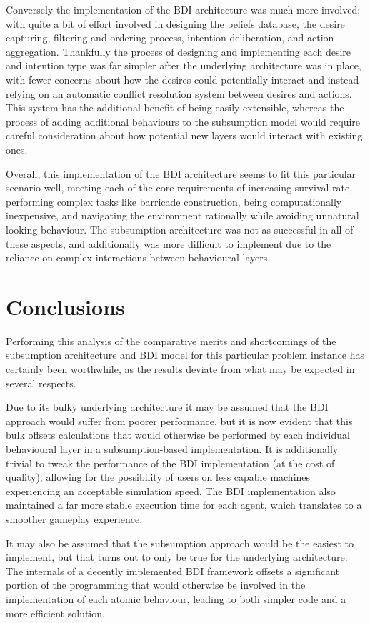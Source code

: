 \documentclass[12pt,a4paper]{article}
\begin{document}
Conversely the implementation of the BDI architecture was much more involved; with quite a bit of effort involved in designing the beliefs database, the desire capturing, filtering and ordering process, intention deliberation, and action aggregation. Thankfully the process of designing and implementing each desire and intention type was far simpler after the underlying architecture was in place, with fewer concerns about how the desires could potentially interact and instead relying on an automatic conflict resolution system between desires and actions. This system has the additional benefit of being easily extensible, whereas the process of adding additional behaviours to the subsumption model would require careful consideration about how potential new layers would interact with existing ones.

Overall, this implementation of the BDI architecture seems to fit this particular scenario well, meeting each of the core requirements of increasing survival rate, performing complex tasks like barricade construction, being computationally inexpensive, and navigating the environment rationally while avoiding unnatural looking behaviour. The subsumption architecture was not as successful in all of these aspects, and additionally was more difficult to implement due to the reliance on complex interactions between behavioural layers.

\section{Conclusions}
\noindent
Performing this analysis of the comparative merits and shortcomings of the subsumption architecture and BDI model for this particular problem instance has certainly been worthwhile, as the results deviate from what may be expected in several respects.

Due to its bulky underlying architecture it may be assumed that the BDI approach would suffer from poorer performance, but it is now evident that this bulk offsets calculations that would otherwise be performed by each individual behavioural layer in a subsumption-based implementation. It is additionally trivial to tweak the performance of the BDI implementation (at the cost of quality), allowing for the possibility of users on less capable machines experiencing an acceptable simulation speed. The BDI implementation also maintained a far more stable execution time for each agent, which translates to a smoother gameplay experience.

It may also be assumed that the subsumption approach would be the easiest to implement, but that turns out to only be true for the underlying architecture. The internals of a decently implemented BDI framework offsets a significant portion of the programming that would otherwise be involved in the implementation of each atomic behaviour, leading to both simpler code and a more efficient solution.
\end{document}
